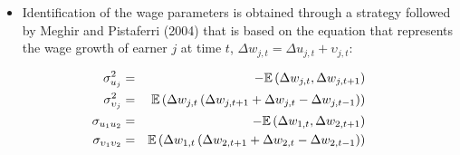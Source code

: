\documentclass[notes=show]{beamer}
\begin{document}
\begin{frame}%


\begin{itemize}
\item Identification of the wage parameters is obtained through a strategy
followed by Meghir and Pistaferri (2004) that is based on the equation that
represents the wage growth of earner $j$ at time $t$, $\Delta w_{j,t}=\Delta
u_{j,t}+\upsilon _{j,t}$:
\end{itemize}

\begin{eqnarray}
\sigma _{u_{j}}^{2} &=&-\mathbb{E}\left( \Delta w_{j,t},\Delta
w_{j,t+1}\right) \\
\sigma _{\upsilon _{j}}^{2} &=&\mathbb{E}\left( \Delta w_{j,t}\left( \Delta
w_{j,t+1}+\Delta w_{j,t}-\Delta w_{j,t-1}\right) \right)  \notag \\
\sigma _{u_{1}u_{2}} &=&-\mathbb{E}\left( \Delta w_{1,t},\Delta
w_{2,t+1}\right)  \notag \\
\sigma _{\upsilon _{1}\upsilon _{2}} &=&\mathbb{E}\left( \Delta
w_{1,t}\left( \Delta w_{2,t+1}+\Delta w_{2,t}-\Delta w_{2,t-1}\right) \right)
\notag
\end{eqnarray}

\transboxout%
\end{frame}%

\bigskip
\end{document}
